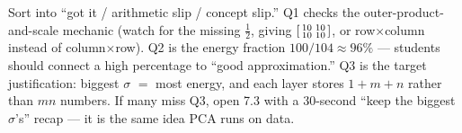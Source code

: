 \documentclass[10pt]{article}
\begin{document}
\begin{teachernote}
Sort into ``got it / arithmetic slip / concept slip.'' Q1 checks the outer-product-and-scale mechanic
(watch for the missing $\tfrac12$, giving $\begin{bsmallmatrix} 10 & 10\\ 10 & 10 \end{bsmallmatrix}$, or
row$\times$column instead of column$\times$row). Q2 is the energy fraction $100/104\approx96\%$ --- students
should connect a high percentage to ``good approximation.'' Q3 is the target justification: biggest $\sigma$
$=$ most energy, and each layer stores $1+m+n$ rather than $mn$ numbers. If many miss Q3, open 7.3 with a
30-second ``keep the biggest $\sigma$'s'' recap --- it is the same idea PCA runs on data.
\end{teachernote}
\end{document}
